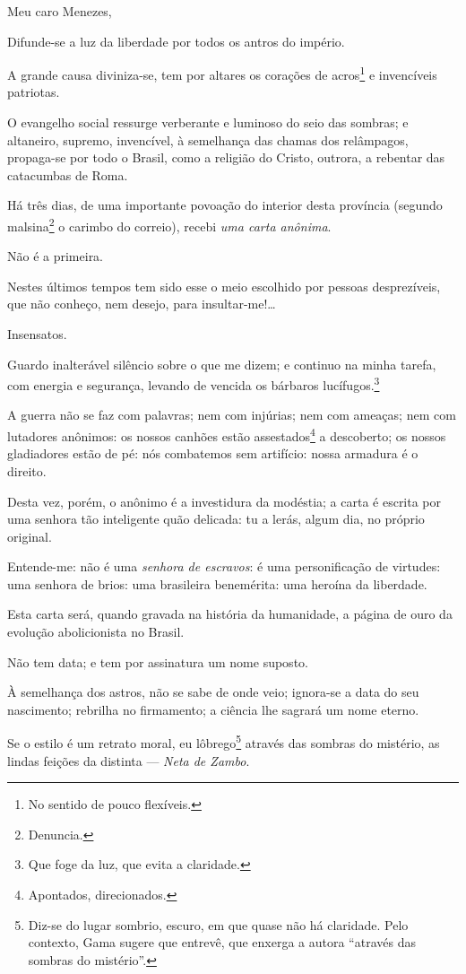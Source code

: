 {Meu caro Menezes,

Difunde-se a luz da liberdade por todos os antros do império.

A grande causa diviniza-se, tem por altares os corações de
acros\footnote{No sentido de pouco flexíveis.} e invencíveis
patriotas.

O evangelho social ressurge verberante e luminoso do seio das sombras; e
altaneiro, supremo, invencível, à semelhança das chamas dos relâmpagos,
propaga-se por todo o Brasil, como a religião do Cristo, outrora, a
rebentar das catacumbas de Roma.

Há três dias, de uma importante povoação do interior desta província
(segundo malsina\footnote{Denuncia.} o carimbo do correio), recebi
\emph{uma carta anônima}.

Não é a primeira.

Nestes últimos tempos tem sido esse o meio escolhido por pessoas
desprezíveis, que não conheço, nem desejo, para insultar-me!\ldots{}

Insensatos.

Guardo inalterável silêncio sobre o que me dizem; e continuo na minha
tarefa, com energia e segurança, levando de vencida os bárbaros
lucífugos.\footnote{Que foge da luz, que evita a claridade.}

A guerra não se faz com palavras; nem com injúrias; nem com ameaças; nem
com lutadores anônimos: os nossos canhões estão assestados\footnote{
  Apontados, direcionados.} a descoberto; os nossos gladiadores estão de
pé: nós combatemos sem artifício: nossa armadura é o direito.

Desta vez, porém, o anônimo é a investidura da modéstia; a carta é
escrita por uma senhora tão inteligente quão delicada: tu a lerás, algum
dia, no próprio original.

Entende-me: não é uma \emph{senhora de escravos}: é uma personificação
de virtudes: uma senhora de brios: uma brasileira benemérita: uma
heroína da liberdade.

Esta carta será, quando gravada na história da humanidade, a página de
ouro da evolução abolicionista no Brasil.

Não tem data; e tem por assinatura um nome suposto.

À semelhança dos astros, não se sabe de onde veio; ignora-se a data do
seu nascimento; rebrilha no firmamento; a ciência lhe sagrará um nome
eterno.

Se o estilo é um retrato moral, eu lôbrego\footnote{Diz-se do lugar
  sombrio, escuro, em que quase não há claridade. Pelo contexto, Gama
  sugere que entrevê, que enxerga a autora ``através das sombras do
  mistério''.} através das sombras do mistério, as lindas feições da
distinta --- \emph{Neta de Zambo}.

}
